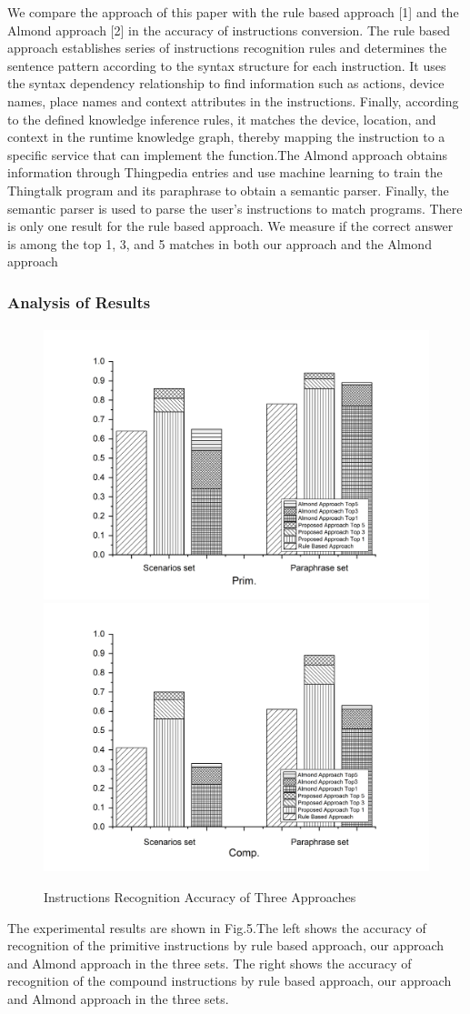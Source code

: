 We compare the approach of this paper with the rule based approach [1] and the Almond approach [2] in the accuracy of instructions conversion. The rule based approach establishes series of instructions recognition rules and determines the sentence pattern according to the syntax structure for each instruction. It uses the syntax dependency relationship to find information such as actions, device names, place names and context attributes in the instructions. Finally, according to the defined knowledge inference rules, it matches the device, location, and context in the runtime knowledge graph, thereby mapping the instruction to a specific service that can implement the function.The Almond approach obtains information through Thingpedia entries and use machine learning to train the Thingtalk program and its paraphrase to obtain a semantic parser. Finally, the semantic parser is used to parse the user's instructions to match programs. There is only one result for the rule based approach. We measure if the correct answer is among the top 1, 3, and 5 matches in both our approach and the Almond approach


\subsubsection{Analysis of Results}
\paragraph{}

\begin{figure}[h]
\centering
\includegraphics[width = .5\textwidth]{fig5_1.png}\includegraphics[width = .5\textwidth]{fig5_2.png}
\caption{Instructions Recognition Accuracy of Three Approaches}
\end{figure}
The experimental results are shown in Fig.5.The left shows the accuracy of recognition of the primitive instructions by rule based approach, our approach and Almond approach in the three sets. The right shows the accuracy of recognition of the compound instructions by rule based approach, our approach and Almond approach in the three sets.

